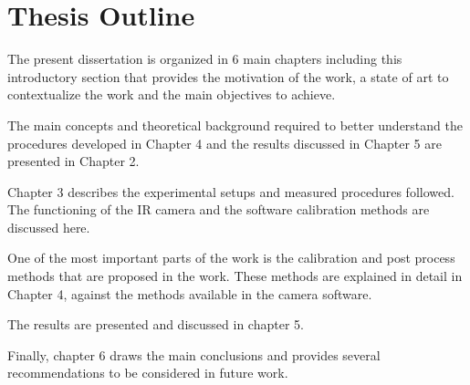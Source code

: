\section{Thesis Outline}
\label{sec:int_outline}

\par The present dissertation is organized in 6 main chapters including this introductory section that provides the motivation of the work, a state of art to contextualize the work and the main objectives to achieve.\\

\par The main concepts and theoretical background required to better understand the procedures developed in Chapter 4 and the results discussed in Chapter 5 are presented in Chapter 2.\\

\par Chapter 3 describes the experimental setups and measured procedures followed. The functioning of the IR camera and the software calibration methods are discussed here.\\

\par One of the most important parts of the work is the calibration and post process methods that are proposed in the work. These methods are explained in detail in Chapter 4, against the methods available in the camera software.\\

\par The results are presented and discussed in chapter 5.\\

\par Finally, chapter 6 draws the main conclusions and provides several recommendations to be considered in future work.

